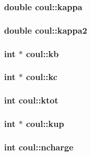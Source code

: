 \subsubsection{\setlength{\rightskip}{0pt plus 5cm}double {\bf coul::kappa}}\label{structcoul_446908c21a8eaf198b7a3ce51036799a}


\subsubsection{\setlength{\rightskip}{0pt plus 5cm}double {\bf coul::kappa2}}\label{structcoul_4ca6eb9b1803c1d64eb3372e8e43be54}


\subsubsection{\setlength{\rightskip}{0pt plus 5cm}int $\ast$ {\bf coul::kb}}\label{structcoul_0314ac6f4bdd614e2e36f870aea7b396}


\subsubsection{\setlength{\rightskip}{0pt plus 5cm}int $\ast$ {\bf coul::kc}}\label{structcoul_5cddc653308a423e328d215ca201b3ed}


\subsubsection{\setlength{\rightskip}{0pt plus 5cm}int {\bf coul::ktot}}\label{structcoul_f3940566a7bd5b81a83cdffef8493b68}


\subsubsection{\setlength{\rightskip}{0pt plus 5cm}int $\ast$ {\bf coul::kup}}\label{structcoul_6d2df175a52c8e2a8496a8813ca5a699}


\subsubsection{\setlength{\rightskip}{0pt plus 5cm}int {\bf coul::ncharge}}\label{structcoul_b50d99492ca3990280242b95f65561ca}


